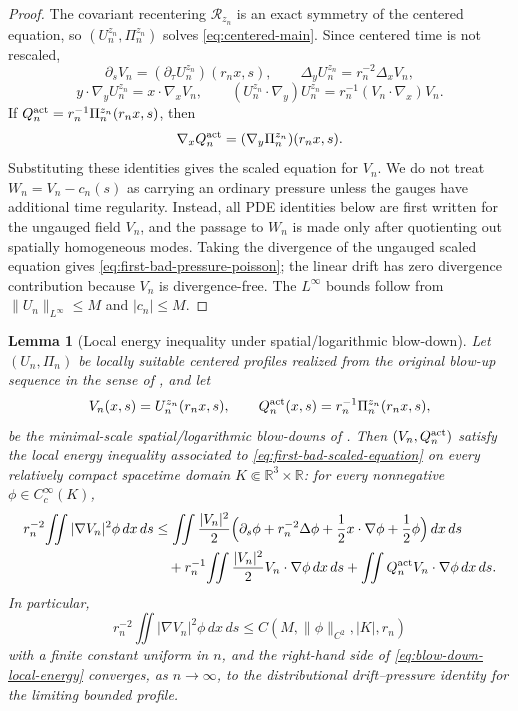 \documentclass[11pt]{amsart}
\numberwithin{equation}{section}
\theoremstyle{plain}
\newtheorem{lemma}[lemma]{Lemma}
\theoremstyle{definition}
\theoremstyle{remark}
\newcommand{\calR}{\mathcal R}
\begin{document}
\begin{proof}
The covariant recentering \(\calR_{z_n}\) is an exact symmetry of the centered
equation, so \((U_n^{z_n},\Pi_n^{z_n})\) solves
\eqref{eq:centered-main}.  Since centered
time is not rescaled,
\[
   \partial_sV_n=(\partial_\tau U_n^{z_n})(r_nx,s),\qquad
   \Delta_yU_n^{z_n}=r_n^{-2}\Delta_xV_n,
\]
\[
   y\cdot\nabla_yU_n^{z_n}=x\cdot\nabla_xV_n,\qquad
   (U_n^{z_n}\cdot\nabla_y)U_n^{z_n}
   =
   r_n^{-1}(V_n\cdot\nabla_x)V_n .
\]
If \(Q_n^{\rm act}=r_n^{-1}\Pi_n^{z_n}(r_nx,s)\), then
\[
   \nabla_xQ_n^{\rm act}=(\nabla_y\Pi_n^{z_n})(r_nx,s).
\]
Substituting these identities gives the scaled equation for \(V_n\).  We do not
treat \(W_n=V_n-c_n(s)\) as carrying an ordinary pressure unless the gauges have
additional time regularity.  Instead, all PDE identities below are first written
for the ungauged field \(V_n\), and the passage to \(W_n\) is made only after
quotienting out spatially homogeneous modes.  Taking the divergence
of the ungauged scaled equation gives
\eqref{eq:first-bad-pressure-poisson}; the linear drift has zero divergence
contribution because \(V_n\) is divergence-free.  The \(L^\infty\) bounds follow
from \(\|U_n\|_{L^\infty}\le M\) and \(|c_n|\le M\).
\end{proof}

\begin{lemma}[Local energy inequality under spatial/logarithmic blow-down]
\label{lem:local-energy-blow-down}
Let \((U_n,\Pi_n)\) be locally suitable centered profiles realized from the
original blow-up sequence in the sense of
, and let
\[
   V_n(x,s)=U_n^{z_n}(r_nx,s),
   \qquad
   Q_n^{\rm act}(x,s)=r_n^{-1}\Pi_n^{z_n}(r_nx,s),
\]
be the minimal-scale spatial/logarithmic blow-downs of
.  Then \((V_n,Q_n^{\rm act})\) satisfy the local
energy inequality associated to
\eqref{eq:first-bad-scaled-equation} on every relatively compact spacetime
domain \(K\Subset\mathbb R^3\times\mathbb R\): for every nonnegative
\(\phi\in C_c^\infty(K)\),
\begin{equation}\label{eq:blow-down-local-energy}
\begin{aligned}
   r_n^{-2}\!\iint |\nabla V_n|^2\phi\,dx\,ds
   &\le
   \iint \frac{|V_n|^2}{2}
   \Bigl(
      \partial_s\phi
      +r_n^{-2}\Delta\phi
      +\frac12 x\cdot\nabla\phi
      +\frac12\phi
   \Bigr)\,dx\,ds\\
   &\quad
   +r_n^{-1}\!\iint
   \frac{|V_n|^2}{2}V_n\cdot\nabla\phi\,dx\,ds
   +\iint Q_n^{\rm act} V_n\cdot\nabla\phi\,dx\,ds .
\end{aligned}
\end{equation}
In particular,
\begin{equation}\label{eq:blow-down-local-energy-bound}
   r_n^{-2}\!\iint |\nabla V_n|^2\phi\,dx\,ds
   \le
   C\!\left(M,\|\phi\|_{C^2},|K|,r_n\right)
\end{equation}
with a finite constant uniform in \(n\), and the right-hand side of
\eqref{eq:blow-down-local-energy} converges, as \(n\to\infty\), to the
distributional drift--pressure identity for the limiting bounded profile.
\end{lemma}
\end{document}
